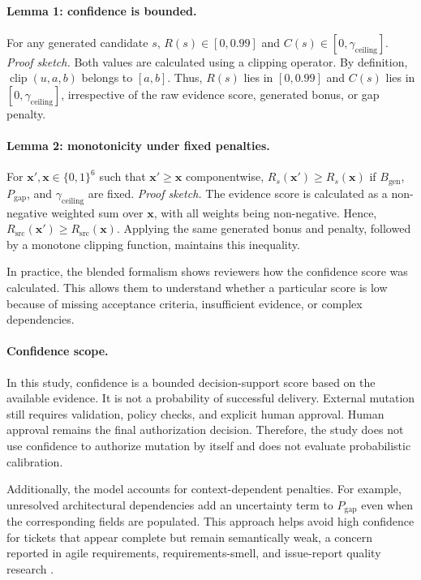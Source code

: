 \documentclass[pdflatex,sn-basic]{sn-jnl}
\begin{document}
\paragraph{Lemma 1: confidence is bounded.}
For any generated candidate $s$, $R(s)\in[0,0.99]$ and $C(s)\in[0,\gamma_{\text{ceiling}}]$.
\textit{Proof sketch.}
Both values are calculated using a clipping operator. By definition, $\operatorname{clip}(u,a,b)$ belongs to $[a,b]$. Thus, $R(s)$ lies in $[0,0.99]$ and $C(s)$ lies in $[0,\gamma_{\text{ceiling}}]$, irrespective of the raw evidence score, generated bonus, or gap penalty.

\paragraph{Lemma 2: monotonicity under fixed penalties.}
For $\mathbf{x}',\mathbf{x}\in\{0,1\}^6$ such that $\mathbf{x}'\ge\mathbf{x}$ componentwise, $R_s(\mathbf{x}')\ge R_s(\mathbf{x})$ if $B_{\text{gen}}$, $P_{\text{gap}}$, and $\gamma_{\text{ceiling}}$ are fixed.
\textit{Proof sketch.}
The evidence score is calculated as a non-negative weighted sum over $\mathbf{x}$, with all weights being non-negative. Hence, $R_{\text{src}}(\mathbf{x}')\ge R_{\text{src}}(\mathbf{x})$. Applying the same generated bonus and penalty, followed by a monotone clipping function, maintains this inequality.

In practice, the blended formalism shows reviewers how the confidence score was calculated. This allows them to understand whether a particular score is low because of missing acceptance criteria, insufficient evidence, or complex dependencies.

\paragraph{Confidence scope.}
In this study, confidence is a bounded decision-support score based on the available evidence. It is not a probability of successful delivery. External mutation still requires validation, policy checks, and explicit human approval. Human approval remains the final authorization decision. Therefore, the study does not use confidence to authorize mutation by itself and does not evaluate probabilistic calibration.

Additionally, the model accounts for context-dependent penalties. For example, unresolved architectural dependencies add an uncertainty term to $P_{\text{gap}}$ even when the corresponding fields are populated. This approach helps avoid high confidence for tickets that appear complete but remain semantically weak, a concern reported in agile requirements, requirements-smell, and issue-report quality research \citep{R65,R52,R53}.
\end{document}
